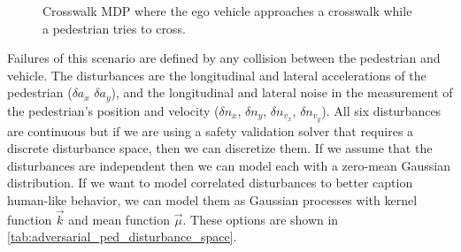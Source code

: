 \begin{figure}
    \centering
    \caption{Crosswalk MDP where the ego vehicle approaches a crosswalk while a pedestrian tries to cross. }
    \label{fig:pedestrian_crosswalk}
\end{figure}


Failures of this scenario are defined by any collision between the pedestrian and vehicle. The disturbances are the longitudinal and lateral accelerations of the pedestrian ($\delta a_x$ $\delta a_y$), and the longitudinal and lateral noise in the measurement of the pedestrian's position and velocity ($\delta n_x$, $\delta n_y$, $\delta n_{v_x}$, $\delta n_{v_y}$). All six disturbances are continuous but if we are using a safety validation solver that requires a discrete disturbance space, then we can discretize them. If we assume that the disturbances are independent then we can model each with a zero-mean Gaussian distribution. If we want to model correlated disturbances to better caption human-like behavior, we can model them as Gaussian processes with kernel function $\vec{k}$ and mean function $\vec{\mu}$. These options are shown in \cref{tab:adversarial_ped_disturbance_space}.


